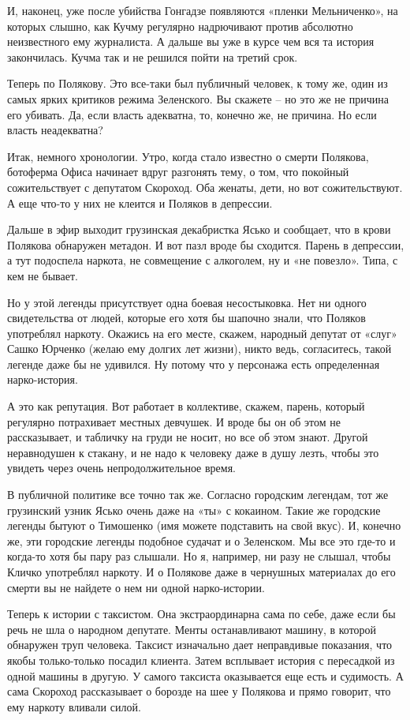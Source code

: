 И, наконец, уже после убийства Гонгадзе появляются «пленки Мельниченко», на
которых слышно, как Кучму регулярно надрючивают против абсолютно неизвестного
ему журналиста. А дальше вы уже в курсе чем вся та история закончилась. Кучма
так и не решился пойти на третий срок.

Теперь по Полякову. Это все-таки был публичный человек, к тому же, один из
самых ярких критиков режима Зеленского. Вы скажете – но это же не причина его
убивать. Да, если власть адекватна, то, конечно же, не причина. Но если власть
неадекватна?

Итак, немного хронологии. Утро, когда стало известно о смерти Полякова,
ботоферма Офиса начинает вдруг разгонять тему, о том, что покойный
сожительствует с депутатом Скороход. Оба женаты, дети, но вот сожительствуют. А
еще что-то у них не клеится и Поляков в депрессии.

Дальше в эфир выходит грузинская декабристка Ясько и сообщает, что в крови
Полякова обнаружен метадон. И вот пазл вроде бы сходится. Парень в депрессии, а
тут подоспела наркота, не совмещение с алкоголем, ну и «не повезло». Типа, с
кем не бывает.

Но у этой легенды присутствует одна боевая несостыковка. Нет ни одного
свидетельства от людей, которые его хотя бы шапочно знали, что Поляков
употреблял наркоту. Окажись на его месте, скажем, народный депутат от «слуг»
Сашко Юрченко (желаю ему долгих лет жизни), никто ведь, согласитесь, такой
легенде даже бы не удивился. Ну потому что у персонажа есть определенная
нарко-история.

А это как репутация. Вот работает в коллективе, скажем, парень, который
регулярно потрахивает местных девчушек. И вроде бы он об этом не рассказывает,
и табличку на груди не носит, но все об этом знают. Другой неравнодушен к
стакану, и не надо к человеку даже в душу лезть, чтобы это увидеть через очень
непродолжительное время.

В публичной политике все точно так же. Согласно городским легендам, тот же
грузинский узник Ясько очень даже на «ты» с кокаином. Такие же городские
легенды бытуют о Тимошенко (имя можете подставить на свой вкус). И, конечно же,
эти городские легенды подобное судачат и о Зеленском. Мы все это где-то и
когда-то хотя бы пару раз слышали. Но я, например, ни разу не слышал, чтобы
Кличко употреблял наркоту. И о Полякове даже в чернушных материалах до его
смерти вы не найдете о нем ни одной нарко-истории.

Теперь к истории с таксистом. Она экстраординарна сама по себе, даже если бы
речь не шла о народном депутате. Менты останавливают машину, в которой
обнаружен труп человека. Таксист изначально дает неправдивые показания, что
якобы только-только посадил клиента. Затем всплывает история с пересадкой из
одной машины в другую. У самого таксиста оказывается еще есть и судимость. А
сама Скороход рассказывает о борозде на шее у Полякова и прямо говорит, что ему
наркоту вливали силой.

